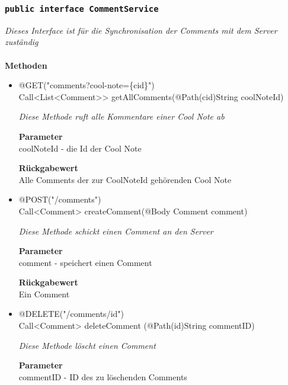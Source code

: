 		\subsubsection{\texttt{public interface CommentService }}
\textit{Dieses Interface ist für die Synchronisation der Comments mit dem Server zuständig}\\
\\
	\textbf{Methoden} \\
		\begin{itemize}
		\item{@GET("comments?cool-note=\{cid\}")\\ Call<List<Comment>> getAllComments(@Path(\grqq cid\grqq)String coolNoteId)}

		\textit{Diese Methode ruft alle Kommentare einer Cool Note ab}

		\textbf{Parameter} \\
	 coolNoteId - die Id der Cool Note 

		\textbf{Rückgabewert} \\
	Alle Comments der zur CoolNoteId gehörenden Cool Note


      \item{@POST("/comments")
\\ Call<Comment> createComment(@Body Comment comment)}

		\textit{Diese Methode schickt einen Comment an den Server }

		\textbf{Parameter} \\
		 comment - speichert einen Comment

		\textbf{Rückgabewert} \\
	Ein Comment

	 \item{@DELETE("/comments/{id}")\\ Call<Comment> deleteComment (@Path(\grqq id\grqq)String commentID)}

		\textit{Diese Methode löscht einen Comment }

		\textbf{Parameter} \\
		 commentID - ID des zu löschenden Comments 



	 \end{itemize}


